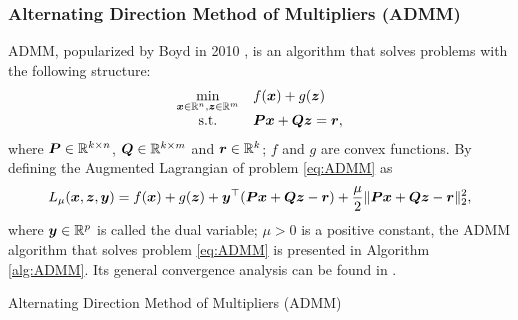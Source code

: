 \subsubsection{Alternating Direction Method of Multipliers (ADMM)}
ADMM, popularized by Boyd \etal in 2010
\cite{ADMM_BOYD2011},
is an algorithm that solves problems with the following structure:
\begin{equation}
    \begin{array}{cl}
        \underset{\bm x \in \mathbb R^n, \bm z \in \mathbb R^m}{\min} &
        f(\bm x) + g(\bm z) \\
        \text{s.t.} &
        \bm P \bm x + \bm Q \bm z = \bm r,
    \end{array}
    \label{eq:ADMM}
\end{equation}
where $\bm P\in\mathbb R^{k \times n}$, $\bm Q\in\mathbb R^{k \times m}$ and $\bm r\in\mathbb R^k$;
$f$ and $g$ are convex functions.
By defining the Augmented Lagrangian of problem \eqref{eq:ADMM} as
\begin{equation}
    L_\mu(\bm x,\bm z,\bm y) = 
    f(\bm x) + g(\bm z) + \bm y^\top(\bm P \bm x + \bm Q \bm z - \bm r) +
    \frac{\mu}{2} \Vert \bm P \bm x + \bm Q \bm z - \bm r \Vert_2^2,
\end{equation}
where $\bm y \in \mathbb R^p$ is called the dual variable; $\mu > 0$ is a positive
constant, the ADMM algorithm that solves problem \eqref{eq:ADMM} is presented
in Algorithm \ref{alg:ADMM}. Its general convergence analysis can be found in
\cite{ADMM_BOYD2011,
      ADMM_GENERAL_CONVERG_ANALYSIS,
      LINEAR_CONVERG_OF_ADMM}.
\begin{algorithm}[H]
    \caption{Alternating Direction Method of Multipliers (ADMM)}
    \label{alg:ADMM}
	\begin{algorithmic}[1]
        \EndFor
    \end{algorithmic}
\end{algorithm}
